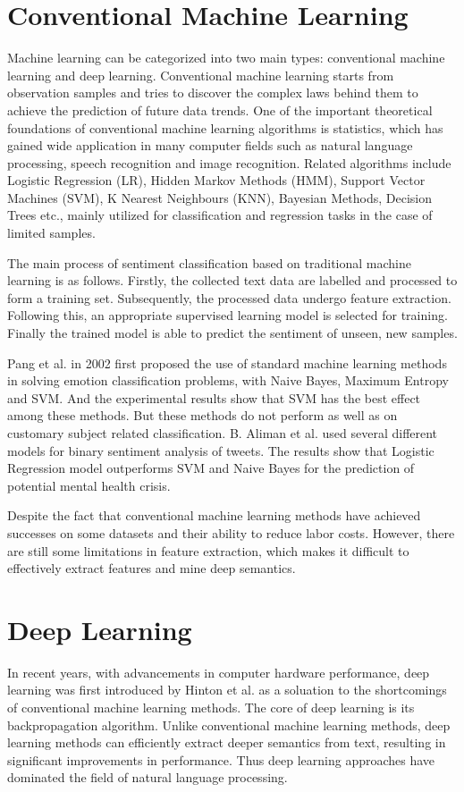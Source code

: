 \documentclass[ %
                    author={Louis Wang},
                supervisor={Dr. Qiang Liu},
                    degree={MSc},
                     title={Identification of Suicide Ideation in Texts},
                      type={},
                      year={2024}]{dissertation}
\begin{document}
\section{Conventional Machine Learning}
\noindent
Machine learning can be categorized into two main types: conventional machine learning and deep learning. Conventional machine learning starts from observation samples and tries to discover the complex laws behind them to achieve the prediction of future data trends. One of the important theoretical foundations of conventional machine learning algorithms is statistics, which has gained wide application in many computer fields such as natural language processing, speech recognition and image recognition. Related algorithms include Logistic Regression (LR), Hidden Markov Methods (HMM), Support Vector Machines (SVM), K Nearest Neighbours (KNN), Bayesian Methods, Decision Trees etc., mainly utilized for classification and regression tasks in the case of limited samples.

The main process of sentiment classification based on traditional machine learning is as follows. Firstly, the collected text data are labelled and processed to form a training set. Subsequently, the processed data undergo feature extraction. Following this, an appropriate supervised learning model is selected for training. Finally the trained model is able to predict the sentiment of unseen, new samples.

Pang et al. in 2002 first proposed the use of standard machine learning methods in solving emotion classification problems, with Naive Bayes, Maximum Entropy and SVM. And the experimental results show that SVM has the best effect among these methods. But these methods do not perform as well as on customary subject related classification.\cite{pang2002thumbs} B. Aliman et al. used several different models for binary sentiment analysis of tweets. The results show that Logistic Regression model outperforms SVM and Naive Bayes for the prediction of potential mental health crisis. \cite{aliman2022sentiment}

Despite the fact that conventional machine learning methods have achieved successes on some datasets and their ability to reduce labor costs. However, there are still some limitations in feature extraction, which makes it difficult to effectively extract features and mine deep semantics.

\section{Deep Learning}
\noindent
In recent years, with advancements in computer hardware performance, deep learning was first introduced by Hinton et al.\cite{hinton2006reducing} as a soluation to the shortcomings of conventional machine learning methods. The core of deep learning is its backpropagation algorithm. Unlike conventional machine learning methods, deep learning methods can efficiently extract deeper semantics from text, resulting in significant improvements in performance. Thus deep learning approaches have dominated the field of natural language processing.
\end{document}
